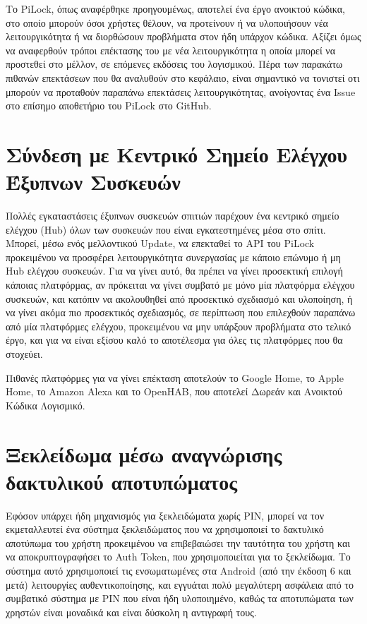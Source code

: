 Το PiLock, όπως αναφέρθηκε προηγουμένως, αποτελεί ένα έργο ανοικτού κώδικα, στο οποίο μπορούν όσοι χρήστες θέλουν, να προτείνουν ή να υλοποιήσουν νέα λειτουργικότητα ή να διορθώσουν προβλήματα στον ήδη υπάρχον κώδικα. Αξίζει όμως να αναφερθούν τρόποι επέκτασης του με νέα λειτουργικότητα η οποία μπορεί να προστεθεί στο μέλλον, σε επόμενες εκδόσεις του λογισμικού. Πέρα των παρακάτω πιθανών επεκτάσεων που θα αναλυθούν στο κεφάλαιο, είναι σημαντικό να τονιστεί οτι μπορούν να προταθούν παραπάνω επεκτάσεις λειτουργικότητας, ανοίγοντας ένα Issue στο επίσημο αποθετήριο του PiLock στο GitHub.  %

\section{Σύνδεση με Κεντρικό Σημείο Ελέγχου Έξυπνων Συσκευών}
	Πολλές εγκαταστάσεις έξυπνων συσκευών σπιτιών παρέχουν ένα κεντρικό σημείο ελέγχου (Hub) όλων των συσκευών που είναι εγκατεστημένες μέσα στο σπίτι. Μπορεί, μέσω ενός μελλοντικού Update, να επεκταθεί το API του PiLock προκειμένου να προσφέρει λειτουργικότητα συνεργασίας με κάποιο επώνυμο ή μη Hub ελέγχου συσκευών. Για να γίνει αυτό, θα πρέπει να γίνει προσεκτική επιλογή κάποιας πλατφόρμας, αν πρόκειται να γίνει συμβατό με μόνο μία πλατφόρμα ελέγχου συσκευών, και κατόπιν να ακολουθηθεί από προσεκτικό σχεδιασμό και υλοποίηση, ή να γίνει ακόμα πιο προσεκτικός σχεδιασμός, σε περίπτωση που επιλεχθούν παραπάνω από μία πλατφόρμες ελέγχου, προκειμένου να μην υπάρξουν προβλήματα στο τελικό έργο, και για να είναι εξίσου καλό το αποτέλεσμα για όλες τις πλατφόρμες που θα στοχεύει.

	Πιθανές πλατφόρμες για να γίνει επέκταση αποτελούν το Google Home, το Apple Home, το Amazon Alexa και το OpenHAB, που αποτελεί Δωρεάν και Ανοικτού Κώδικα Λογισμικό.

\section{Ξεκλείδωμα μέσω αναγνώρισης δακτυλικού αποτυπώματος}
	Εφόσον υπάρχει ήδη μηχανισμός για ξεκλειδώματα χωρίς PIN, μπορεί να τον εκμεταλλευτεί ένα σύστημα ξεκλειδώματος που να χρησιμοποιεί το δακτυλικό αποτύπωμα του χρήστη προκειμένου να επιβεβαιώσει την ταυτότητα του χρήστη και να αποκρυπτογραφήσει το Auth Token, που χρησιμοποιείται για το ξεκλείδωμα. Το σύστημα αυτό χρησιμοποιεί τις ενσωματωμένες στα Android (από την έκδοση 6 και μετά) λειτουργίες αυθεντικοποίησης, και εγγυάται πολύ μεγαλύτερη ασφάλεια από το συμβατικό σύστημα με PIN που είναι ήδη υλοποιημένο, καθώς τα αποτυπώματα των χρηστών είναι μοναδικά και είναι δύσκολη η αντιγραφή τους.

